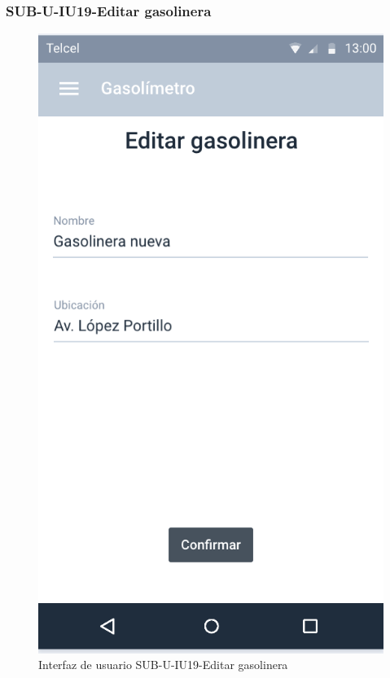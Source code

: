 \subsubsection{SUB-U-IU19-Editar gasolinera}\label{SUB-U-IU19}
\begin{figure}[H]
	\centering
	\includegraphics[scale=1]{Capitulo4/software/submodulos/usuarios/images/sub-u-iu19}
	\caption{Interfaz de usuario SUB-U-IU19-Editar gasolinera}
	\label{fig:sub-u-iu19}
\end{figure}